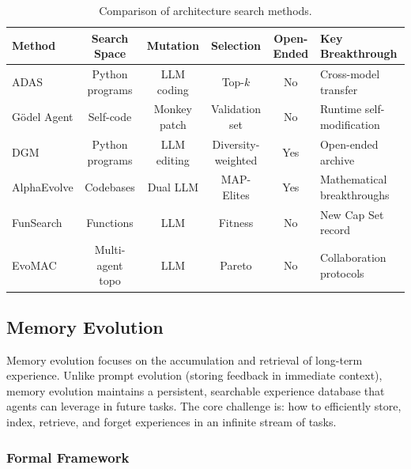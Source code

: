 \begin{table}[htbp]
\centering
\caption{Comparison of architecture search methods.}
\label{tab:arch-compare}
\begin{tabular}{lccccp{35mm}}
\toprule
\textbf{Method} & \textbf{Search Space} & \textbf{Mutation} & \textbf{Selection} & \textbf{Open-Ended} & \textbf{Key Breakthrough} \\
\midrule
ADAS & Python programs & LLM coding & Top-$k$ & No & Cross-model transfer \\
G\"{o}del Agent & Self-code & Monkey patch & Validation set & No & Runtime self-modification \\
DGM & Python programs & LLM editing & Diversity-weighted & Yes & Open-ended archive \\
AlphaEvolve & Codebases & Dual LLM & MAP-Elites & Yes & Mathematical breakthroughs \\
FunSearch & Functions & LLM & Fitness & No & New Cap Set record \\
EvoMAC & Multi-agent topo & LLM & Pareto & No & Collaboration protocols \\
\bottomrule
\end{tabular}
\end{table}

\subsection{Memory Evolution}\label{sec:memory}

Memory evolution focuses on the accumulation and retrieval of long-term experience. Unlike prompt evolution (storing feedback in immediate context), memory evolution maintains a persistent, searchable experience database that agents can leverage in future tasks. The core challenge is: how to efficiently store, index, retrieve, and forget experiences in an infinite stream of tasks.

\subsubsection{Formal Framework}

